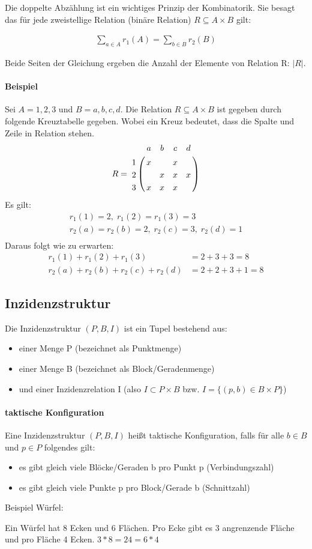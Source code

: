Die doppelte Abzählung ist ein wichtiges Prinzip der Kombinatorik.
Sie besagt das für jede zweistellige Relation (binäre Relation) $R \subseteq A \times B$
gilt:

\begin{align}
  \sum_{a \in A} r_{1}(A) = \sum_{b \in B} r_{2}(B)
\end{align}

Beide Seiten der Gleichung ergeben die Anzahl der Elemente von Relation R: $|R|$.

\paragraph{Beispiel}
Sei $A = {1, 2, 3}$ und $B = {a, b, c, d}$. Die Relation $R \subseteq
A \times B$ ist gegeben durch folgende Kreuztabelle gegeben. Wobei ein
Kreuz bedeutet, dass die Spalte und Zeile in Relation stehen.
\begin{align*}
  R =
  \bordermatrix{
    & a & b & c & d \cr
   1& x &   & x &   \cr
   2&   & x & x & x \cr
   3& x & x & x &   \cr
  }
\end{align*}
Es gilt:
\begin{align*}
  r_{1}(1)=2,\; r_{1}(2)=r_{1}(3)=3\\
  r_{2}(a)=r_{2}(b)=2,\; r_{2}(c)=3,\; r_{2}(d)=1\\
\end{align*}
Daraus folgt wie zu erwarten:
\begin{align*}
  r_{1}(1) + r_{1}(2) + r_{1}(3) &= 2 + 3 + 3 = 8\\
  r_{2}(a) + r_{2}(b) + r_{2}(c) + r_{2}(d) &= 2 + 2 + 3 + 1 = 8
\end{align*}


\subsection{Inzidenzstruktur}
Die Inzidenzstruktur $(P,B,I)$ ist ein Tupel bestehend aus:
\begin{itemize}
\item einer Menge P (bezeichnet als Punktmenge)
\item einer Menge B (bezeichnet als Block/Geradenmenge)
\item und einer Inzidenzrelation I (also $I \subset P\times B$ bzw.
  $I = \{(p,b) \in B \times P\}$)
\end{itemize}

\paragraph{taktische Konfiguration}
Eine Inzidenzstruktur $(P,B,I)$ heißt taktische Konfiguration, falls
für alle $b\in B$ und $p \in P$ folgendes gilt:
\begin{itemize}
\item es gibt gleich viele Blöcke/Geraden b pro Punkt p (Verbindungszahl)
\item es gibt gleich viele Punkte p pro Block/Gerade b (Schnittzahl)
\end{itemize}

Beispiel Würfel:

Ein Würfel hat 8 Ecken und 6 Flächen. Pro Ecke gibt es 3 angrenzende
Fläche und pro Fläche 4 Ecken. $3 * 8 = 24 = 6 * 4$

